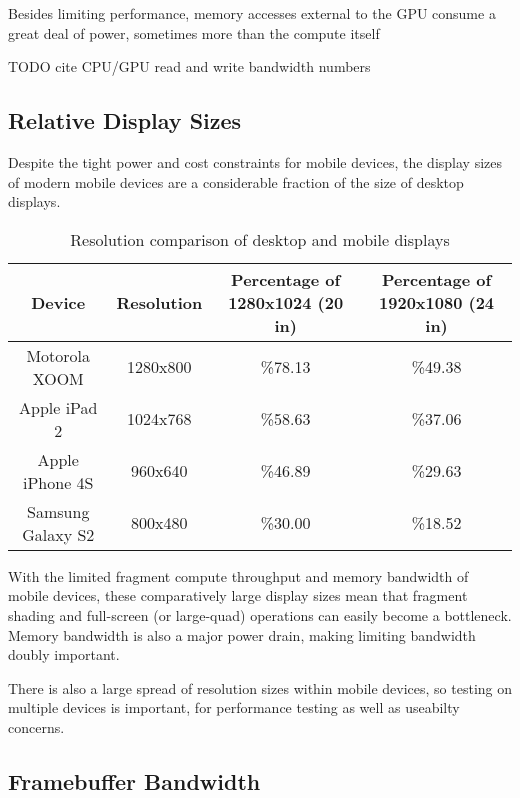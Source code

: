 Besides limiting performance, memory accesses external to the GPU consume a great deal of power, sometimes more than the compute itself \cite{Antochi04}

TODO cite CPU/GPU read and write bandwidth numbers

\subsection{Relative Display Sizes}\label{Jon-McCaffrey:differences-in-memory-architecture}


Despite the tight power and cost constraints for mobile devices, the display sizes of modern mobile devices are a considerable fraction of the size of desktop displays.  

\begin{table}[htb]\centering
\begin{tabular}{|c|c|c|c|}
\hline%
\small{Device} & \small{Resolution} & \small{Percentage of 1280x1024 (20 in)} & \small{Percentage of 1920x1080 (24 in)}  \\
\hline%
\small{Motorola XOOM} & \small{1280x800} & \small{\%78.13} & \small{\%49.38}\\
\hline%
\small{Apple iPad 2} & \small{1024x768} & \small{\%58.63} & \small{\%37.06}\\
\hline%
\small{Apple iPhone 4S} & \small{960x640} & \small{\%46.89} & \small{\%29.63}\\
\hline%
\small{Samsung Galaxy S2} & \small{800x480} & \small{\%30.00} & \small{\%18.52}\\
\hline%
\end{tabular}
 \caption{Resolution comparison of desktop and mobile displays}
 \label{JonMcCaffrey:resolutions}
\end{table}


With the limited fragment compute throughput and memory bandwidth of mobile devices, these comparatively large display sizes mean that fragment shading and full-screen (or large-quad) operations can easily become a bottleneck.  Memory bandwidth is also a major power drain, making limiting bandwidth doubly important.

There is also a large spread of resolution sizes within mobile devices, so testing on multiple devices is important, for performance testing as well as useabilty concerns.

\subsection{Framebuffer Bandwidth}\label{Jon-McCaffrey-Framebuffer-Bandwidth}

